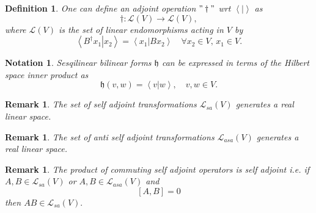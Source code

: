 \documentclass[aps,preprint]{revtex4}%
\newtheorem{definition}[theorem]{Definition}
\newtheorem{notation}[theorem]{Notation}
\newtheorem{remark}[theorem]{Remark}
\begin{document}
\begin{definition}
One can define an adjoint operation $"\dagger"$ wrt $\left\langle \left.
{}\right\vert \right\rangle $ as
\begin{equation}
\dagger:\mathcal{L}\left(  V\right)  \rightarrow\mathcal{L}\left(  V\right)  ,
\end{equation}
where $\mathcal{L}\left(  V\right)  $ is the set of linear endomorphisms
acting in $V$ by
\begin{equation}
\left\langle \left.  B^{\dagger}x_{1}\right\vert x_{2}\right\rangle
=\left\langle \left.  x_{1}\right\vert Bx_{2}\right\rangle \quad\forall
x_{2}\in V,\,x_{1}\in V.
\end{equation}

\end{definition}

\begin{notation}
Sesqilinear bilinear forms $\mathfrak{h}$ can be expressed in terms of the
Hilbert space inner product as
\begin{equation}
\mathfrak{h}\left(  v,w\right)  =\left\langle \left.  v\right\vert
w\right\rangle ,\quad v,w\in V.
\end{equation}

\end{notation}

\begin{remark}
The set of self adjoint transformations $\mathcal{L}_{sa}\left(  V\right)  $
generates a \emph{real} linear space.
\end{remark}

\begin{remark}
The set of anti self adjoint transformations $\mathcal{L}_{asa}\left(
V\right)  $ generates a \emph{real} linear space.
\end{remark}

\begin{remark}
The product of commuting self adjoint operators is self adjoint i.e. if
$A,B\in\mathcal{L}_{sa}\left(  V\right)  $ or $A,B\in\mathcal{L}_{asa}\left(
V\right)  $ and
\begin{equation}
\left[  A,B\right]  =0
\end{equation}
then $AB\in\mathcal{L}_{sa}\left(  V\right)  .$
\end{remark}
\end{document}
